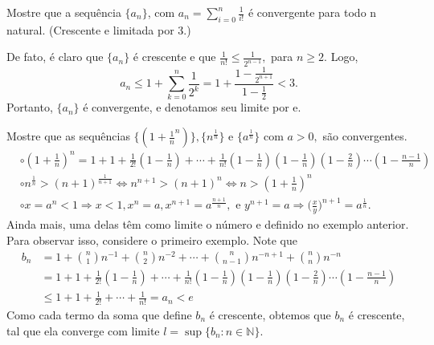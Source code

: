 \documentclass[analysis_notes.tex]{subfiles}
\begin{document}
\begin{example}
	Mostre que a sequ\^encia $\{a_{n}\}$, com $a_{n} = \displaystyle \sum\limits_{i=0}^{n}\frac{1}{i!}$ \'e convergente para todo n natural. (Crescente e limitada por 3.)

	De fato, \'e claro que $\{a_{n}\} $ \'e crescente e que $\frac{1}{n!}\leq{\frac{1}{2^{n-1}}},$ para $n\geq{2}.$ Logo,
	$$
		a_{n}\leq{1+\sum\limits_{k=0}^{n}\frac{1}{2^{k}}} =
		1 + \frac{1-\frac{1}{2^{n+1}}}{1-\frac{1}{2}} < 3.
	$$
	Portanto, $\{a_{n}\}$ \'e convergente, e denotamos seu limite por e.
\end{example}
\begin{example}
	Mostre que as sequ\^encias $\biggl\{(1+\frac{1}{n}^{n})\biggr\}, \{n^{\frac{1}{n}}\}$ e $\{a^{\frac{1}{n}}\}$ com $a >0,$ s\~ao
	convergentes.
	\begin{align*}
		 & \circ (1+\frac{1}{n})^{n} = 1 + 1 + \frac{1}{2!}(1-\frac{1}{n}) + \cdots + \frac{1}{n!}(1-\frac{1}{n})(1-\frac{1}{n})(1-\frac{2}{n})\cdots(1-\frac{n-1}{n})        \\
		 & \circ n^{\frac{1}{n}} > (n+1)^{\frac{1}{n+1}}\Longleftrightarrow n^{n+1} > (n+1)^{n}\Longleftrightarrow n>(1+\frac{1}{n})^{n}                                      \\
		 & \circ x = a^{n} < 1\Rightarrow x < 1, x^{n} = a, x^{n+1} = a^{\frac{n+1}{n}},\text{ e } y^{n+1} = a \Rightarrow \biggl(\frac{x}{y}\biggr)^{n+1} = a^{\frac{1}{n}}.
	\end{align*}
	Ainda mais, uma delas t\^em como limite o n\'umero e definido no exemplo anterior. Para observar isso, considere o primeiro exemplo. Note que
	\begin{align*}
		b_{n} & = 1 + \binom{n}{1}n^{-1} + \binom{n}{2}n^{-2} + \cdots + \binom{n}{n-1}n^{-n+1} + \binom{n}{n}n^{-n}                              \\
		      & = 1 + 1 + \frac{1}{2!}(1-\frac{1}{n}) + \cdots + \frac{1}{n!}(1-\frac{1}{n})(1-\frac{1}{n})(1-\frac{2}{n})\cdots(1-\frac{n-1}{n}) \\
		      & \leq{1 + 1 + \frac{1}{2!} + \cdots + \frac{1}{n!} = a_{n} < e}
	\end{align*}
	Como cada termo da soma que define $b_{n}$ \'e crescente, obtemos que $b_{n}$ \'e crescente, tal que ela converge com limite $l = \sup{\{b_{n}:n\in \mathbb{N}\}}$.


\end{example}
\end{document}
